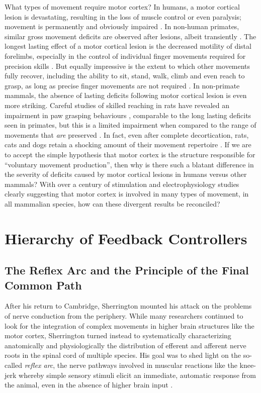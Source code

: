 What types of movement require motor cortex? In humans, a motor cortical lesion is devastating, resulting in the loss of muscle control or even paralysis; movement is permanently and obviously impaired \cite{Laplane1977}. In non-human primates, similar gross movement deficits are observed after lesions, albeit transiently \cite{Leyton1917}. The longest lasting effect of a motor cortical lesion is the decreased motility of distal forelimbs, especially in the control of individual finger movements required for precision skills \cite{Leyton1917,Darling2011}. But equally impressive is the extent to which other movements fully recover, including the ability to sit, stand, walk, climb and even reach to grasp, as long as precise finger movements are not required \cite{Leyton1917,Darling2011,Zaaimi2012}. In non-primate mammals, the absence of lasting deficits following motor cortical lesion is even more striking. Careful studies of skilled reaching in rats have revealed an impairment in paw grasping behaviours \cite{Whishaw1991,Alaverdashvili2008a}, comparable to the long lasting deficits seen in primates, but this is a limited impairment when compared to the range of movements that \emph{are} preserved \cite{Whishaw1991,Kawai2015}. In fact, even after complete decortication, rats, cats and dogs retain a shocking amount of their movement repertoire \cite{Goltz1888,Bjursten1976,Terry1989}. If we are to accept the simple hypothesis that motor cortex is the structure responsible for ``voluntary movement production'', then why is there such a blatant difference in the severity of deficits caused by motor cortical lesions in humans versus other mammals? With over a century of stimulation and electrophysiology studies clearly suggesting that motor cortex is involved in many types of movement, in all mammalian species, how can these divergent results be reconciled?

\section{Hierarchy of Feedback Controllers}

\subsection{The Reflex Arc and the Principle of the Final Common Path}

After his return to Cambridge, Sherrington mounted his attack on the problems of nerve conduction from the periphery. While many researchers continued to look for the integration of complex movements in higher brain structures like the motor cortex, Sherrington turned instead to systematically characterizing anatomically and physiologically the distribution of efferent \cite{Sherrington1892} and afferent \cite{Sherrington1893a} nerve roots in the spinal cord of multiple species. His goal was to shed light on the so-called \emph{reflex arc}, the nerve pathways involved in muscular reactions like the knee-jerk whereby simple sensory stimuli elicit an immediate, automatic response from the animal, even in the absence of higher brain input \cite{Sherrington1893b}.

